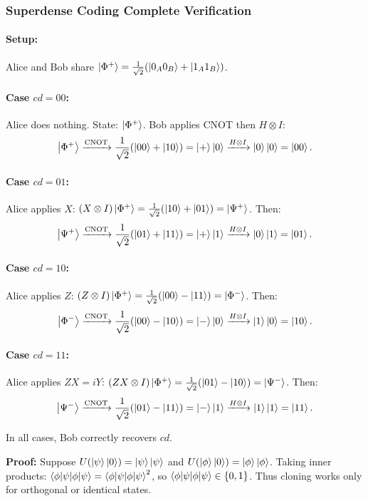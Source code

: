 \documentclass[10pt,a4paper]{article}
\begin{document}
\subsubsection*{Superdense Coding Complete Verification}

\paragraph{Setup:} Alice and Bob share $\ket{\Phi^+}=\frac{1}{\sqrt{2}}(\ket{0_A0_B}+\ket{1_A1_B})$.

\paragraph{Case $cd=00$:} Alice does nothing. State: $\ket{\Phi^+}$. Bob applies CNOT then $H\otimes I$:
\[
\ket{\Phi^+}\xrightarrow{\text{CNOT}}\frac{1}{\sqrt{2}}(\ket{00}+\ket{10})=\ket{+}\ket{0}\xrightarrow{H\otimes I}\ket{0}\ket{0}=\ket{00}.
\]

\paragraph{Case $cd=01$:} Alice applies $X$: $(X\otimes I)\ket{\Phi^+}=\frac{1}{\sqrt{2}}(\ket{10}+\ket{01})=\ket{\Psi^+}$. Then:
\[
\ket{\Psi^+}\xrightarrow{\text{CNOT}}\frac{1}{\sqrt{2}}(\ket{01}+\ket{11})=\ket{+}\ket{1}\xrightarrow{H\otimes I}\ket{0}\ket{1}=\ket{01}.
\]

\paragraph{Case $cd=10$:} Alice applies $Z$: $(Z\otimes I)\ket{\Phi^+}=\frac{1}{\sqrt{2}}(\ket{00}-\ket{11})=\ket{\Phi^-}$. Then:
\[
\ket{\Phi^-}\xrightarrow{\text{CNOT}}\frac{1}{\sqrt{2}}(\ket{00}-\ket{10})=\ket{-}\ket{0}\xrightarrow{H\otimes I}\ket{1}\ket{0}=\ket{10}.
\]

\paragraph{Case $cd=11$:} Alice applies $ZX=iY$: $(ZX\otimes I)\ket{\Phi^+}=\frac{1}{\sqrt{2}}(\ket{01}-\ket{10})=\ket{\Psi^-}$. Then:
\[
\ket{\Psi^-}\xrightarrow{\text{CNOT}}\frac{1}{\sqrt{2}}(\ket{01}-\ket{11})=\ket{-}\ket{1}\xrightarrow{H\otimes I}\ket{1}\ket{1}=\ket{11}.
\]

In all cases, Bob correctly recovers $cd$.

\textbf{Proof:} Suppose $U(\ket{\psi}\ket{0})=\ket{\psi}\ket{\psi}$ and $U(\ket{\phi}\ket{0})=\ket{\phi}\ket{\phi}$. Taking inner products: $\braket{\phi|\psi}=\braket{\phi|\psi}^2$, so $\braket{\phi|\psi}\in\{0,1\}$. Thus cloning works only for orthogonal or identical states.
\end{document}
